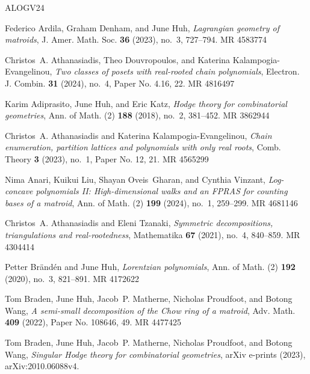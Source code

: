 \documentclass[11pt]{amsart}
\theoremstyle{theorems}
\theoremstyle{definition}
\begin{document}
\newcommand{\etalchar}[1]{$^{#1}$}
\providecommand{\bysame}{\leavevmode\hbox to3em{\hrulefill}\thinspace}
\providecommand{\MR}{\relax\ifhmode\unskip\space\fi MR }
\providecommand{\MRhref}[2]{%
  \href{http://www.ams.org/mathscinet-getitem?mr=#1}{#2}
}
\providecommand{\href}[2]{#2}

\begin{thebibliography}{ALOGV24}

Federico Ardila, Graham Denham, and June Huh, \emph{Lagrangian geometry of matroids}, J. Amer. Math. Soc. \textbf{36} (2023), no.~3, 727--794. \MR{4583774}

Christos~A. {Athanasiadis}, Theo {Douvropoulos}, and Katerina {Kalampogia-Evangelinou}, \emph{{Two classes of posets with real-rooted chain polynomials}}, Electron. J. Combin. \textbf{31} (2024), no.~4, Paper No. 4.16, 22. \MR{4816497}

Karim Adiprasito, June Huh, and Eric Katz, \emph{Hodge theory for combinatorial geometries}, Ann. of Math. (2) \textbf{188} (2018), no.~2, 381--452. \MR{3862944}

Christos~A. Athanasiadis and Katerina Kalampogia-Evangelinou, \emph{Chain enumeration, partition lattices and polynomials with only real roots}, Comb. Theory \textbf{3} (2023), no.~1, Paper No. 12, 21. \MR{4565299}

Nima Anari, Kuikui Liu, Shayan Oveis~Gharan, and Cynthia Vinzant, \emph{Log-concave polynomials {II}: {H}igh-dimensional walks and an {FPRAS} for counting bases of a matroid}, Ann. of Math. (2) \textbf{199} (2024), no.~1, 259--299. \MR{4681146}

Christos~A. Athanasiadis and Eleni Tzanaki, \emph{Symmetric decompositions, triangulations and real-rootedness}, Mathematika \textbf{67} (2021), no.~4, 840--859. \MR{4304414}

Petter Br\"and\'en and June Huh, \emph{Lorentzian polynomials}, Ann. of Math. (2) \textbf{192} (2020), no.~3, 821--891. \MR{4172622}

\bibitem[BHM{\etalchar{+}}22]{BHMPW1}
Tom Braden, June Huh, Jacob~P. Matherne, Nicholas Proudfoot, and Botong Wang, \emph{A semi-small decomposition of the {C}how ring of a matroid}, Adv. Math. \textbf{409} (2022), Paper No. 108646, 49. \MR{4477425}

\bibitem[BHM{\etalchar{+}}23]{BHMPW2}
Tom {Braden}, June {Huh}, Jacob~P. {Matherne}, Nicholas {Proudfoot}, and Botong {Wang}, \emph{{Singular Hodge theory for combinatorial geometries}}, arXiv e-prints (2023), arXiv:2010.06088v4.


\end{thebibliography}
\end{document}
